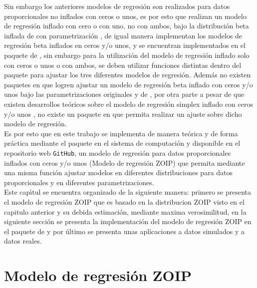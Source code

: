 Sin embargo los anteriores modelos de regresi\'{o}n son realizados para datos proporcionales no inflados con ceros o unos, es por esto que \cite{Ospina1} realizan un modelo de regresi\'{o}n inflado con cero o con uno, no con ambos, bajo la distribuci\'{o}n beta inflada de \cite{Ospina2} con parametrizaci\'{o}n \cite{Ferrari2}, de igual manera \cite{Stasinopoulos2} implementan los modelos de regresi\'{o}n beta inflados en ceros y/o unos, y se encuentran implementados en el paquete  de  \citep{Stasinopoulos1}, sin embargo para la utilizaci\'{o}n del modelo de regresi\'{o}n inflado solo con ceros o unos o con ambos, se deben utilizar funciones distintas dentro del paquete para ajustar los tres diferentes modelos de regresi\'{o}n. Adem\'{a}s no existen paquetes en  que logren ajustar un modelo de regresi\'{o}n beta inflado con ceros y/o unos bajo las parametrizaciones originales y de \cite{Ferrari2}, por otra parte a pesar de que existen desarrollos te\'{o}ricos sobre el modelo de regresi\'{o}n simplex inflado con ceros y/o unos \citep{Galvis1}, no existe un paquete en  que permita realizar un ajuste sobre dicho modelo de regresi\'{o}n.\\

Es por esto que en este trabajo se implementa de manera te\'{o}rica y de forma pr\'{a}ctica mediante el paquete  en el sistema de computaci\'{o}n  \citep{R} y disponible en el repositorio web \verb|GitHub|, un modelo de regresi\'{o}n para datos proporcionales inflados con ceros y/o unos (Modelo de regresi\'{o}n ZOIP) que permita mediante una misma funci\'{o}n ajustar modelos en diferentes distribuciones para datos proporcionales y en diferentes parametrizaciones.\\

Este cap\'{\i}tul se encuentra organizado de la siguiente manera: primero se presenta el modelo de regresi\'{o}n ZOIP que es basado en la distribucion ZOIP visto en el capitulo anterior y su debida estimaci\'{o}n, mediante maxima verosimilitud, en la siguiente secci\'{o}n se presenta la implementaci\'{o}n del modelo de regresi\'{o}n ZOIP en el paquete  de  y por \'{u}ltimo se presenta unas aplicaciones a datos simulados y a datos reales.


\section{Modelo de regresi\'{o}n ZOIP}

